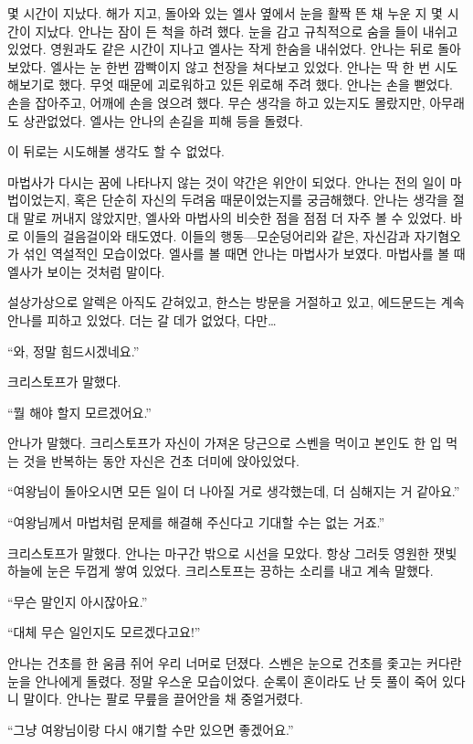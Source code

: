몇 시간이 지났다. 해가 지고, 돌아와 있는 엘사 옆에서 눈을 활짝 뜬 채 누운 지 몇 시간이 지났다. 안나는 잠이 든 척을 하려 했다. 눈을 감고 규칙적으로 숨을 들이 내쉬고 있었다. 영원과도 같은 시간이 지나고 엘사는 작게 한숨을 내쉬었다. 안나는 뒤로 돌아보았다. 엘사는 눈 한번 깜빡이지 않고 천장을 쳐다보고 있었다. 안나는 딱 한 번 시도해보기로 했다. 무엇 때문에 괴로워하고 있든 위로해 주려 했다. 안나는 손을 뻗었다. 손을 잡아주고, 어깨에 손을 얹으려 했다. 무슨 생각을 하고 있는지도 몰랐지만, 아무래도 상관없었다. 엘사는 안나의 손길을 피해 등을 돌렸다.

이 뒤로는 시도해볼 생각도 할 수 없었다.

마법사가 다시는 꿈에 나타나지 않는 것이 약간은 위안이 되었다. 안나는 전의 일이 마법이었는지, 혹은 단순히 자신의 두려움 때문이었는지를 궁금해했다. 안나는 생각을 절대 말로 꺼내지 않았지만, 엘사와 마법사의 비슷한 점을 점점 더 자주 볼 수 있었다. 바로 이들의 걸음걸이와 태도였다. 이들의 행동—모순덩어리와 같은, 자신감과 자기혐오가 섞인 역설적인 모습이었다. 엘사를 볼 때면 안나는 마법사가 보였다. 마법사를 볼 때 엘사가 보이는 것처럼 말이다.

설상가상으로 알렉은 아직도 갇혀있고, 한스는 방문을 거절하고 있고, 에드문드는 계속 안나를 피하고 있었다. 더는 갈 데가 없었다, 다만\ldots

``와, 정말 힘드시겠네요.''

크리스토프가 말했다.

``뭘 해야 할지 모르겠어요.''

안나가 말했다. 크리스토프가 자신이 가져온 당근으로 스벤을 먹이고 본인도 한 입 먹는 것을 반복하는 동안 자신은 건초 더미에 앉아있었다.

``여왕님이 돌아오시면 모든 일이 더 나아질 거로 생각했는데, 더 심해지는 거 같아요.''

``여왕님께서 마법처럼 문제를 해결해 주신다고 기대할 수는 없는 거죠.''

크리스토프가 말했다. 안나는 마구간 밖으로 시선을 모았다. 항상 그러듯 영원한 잿빛 하늘에 눈은 두껍게 쌓여 있었다. 크리스토프는 끙하는 소리를 내고 계속 말했다.

``무슨 말인지 아시잖아요.''

``대체 무슨 일인지도 모르겠다고요!''

안나는 건초를 한 움큼 쥐어 우리 너머로 던졌다. 스벤은 눈으로 건초를 좇고는 커다란 눈을 안나에게 돌렸다. 정말 우스운 모습이었다. 순록이 혼이라도 난 듯 풀이 죽어 있다니 말이다. 안나는 팔로 무릎을 끌어안을 채 중얼거렸다.

``그냥 여왕님이랑 다시 얘기할 수만 있으면 좋겠어요.''

